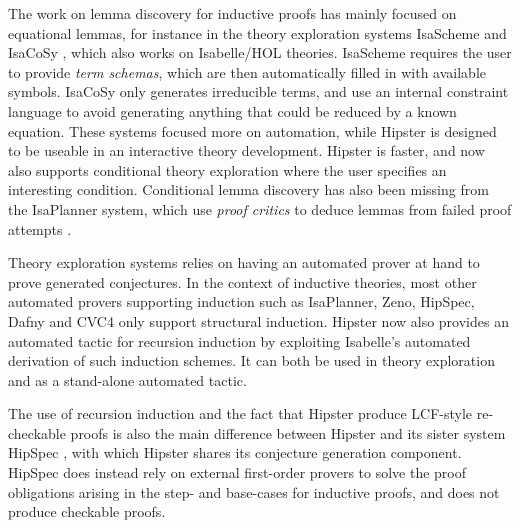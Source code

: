 \label{sec:related}

The work on lemma discovery for inductive proofs has mainly focused on equational lemmas, for instance in the theory exploration systems IsaScheme and IsaCoSy \cite{isascheme,isacosy}, which also works on Isabelle/HOL theories. IsaScheme requires the user to provide \emph{term schemas}, which are then automatically filled in with available symbols. IsaCoSy only generates irreducible terms, and use an internal constraint language to avoid generating anything that could be reduced by a known equation. These systems focused more on automation, while Hipster is designed to be useable in an interactive theory development. Hipster is faster, and now also supports conditional theory exploration where the user specifies an interesting condition. Conditional lemma discovery has also been missing from the IsaPlanner system, which use \emph{proof critics} to deduce lemmas from failed proof attempts \cite{isaplanner2,IsaPcase}. 

Theory exploration systems relies on having an automated prover at hand to prove generated conjectures. In the context of inductive theories, most other automated provers supporting induction such as IsaPlanner, Zeno, HipSpec, Dafny and CVC4 \cite{isaplanner2, zeno, hipspecCADE,dafny,cvc4} only support structural induction. Hipster now also provides an automated tactic for recursion induction by exploiting Isabelle's automated derivation of such induction schemes. It can both be used in theory exploration and as a stand-alone automated tactic. 

The use of recursion induction and the fact that Hipster produce LCF-style re-checkable proofs is also the main difference between Hipster and its sister system HipSpec \cite{hipspecCADE}, with which Hipster shares its conjecture generation component. HipSpec does instead rely on external first-order provers to solve the proof obligations arising in the step- and base-cases for inductive proofs, and does not produce checkable proofs. 